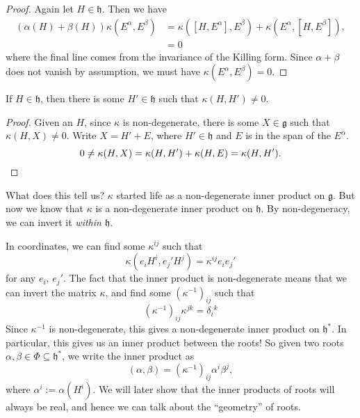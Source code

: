 \documentclass[a4paper]{article}
\begin{document}
\begin{proof}
  Again let $H \in \mathfrak{h}$. Then we have
  \begin{align*}
    (\alpha(H) + \beta(H)) \kappa(E^\alpha, E^\beta) &= \kappa([H, E^\alpha], E^\beta) + \kappa(E^\alpha, [H, E^\beta]),\\
    &= 0
  \end{align*}
  where the final line comes from the invariance of the Killing form. Since $\alpha + \beta$ does not vanish by assumption, we must have $\kappa(E^\alpha, E^\beta) = 0$.
\end{proof}

\begin{lemma}
  If $H \in \mathfrak{h}$, then there is some $H' \in \mathfrak{h}$ such that $\kappa(H, H') \not= 0$.
\end{lemma}

\begin{proof}
  Given an $H$, since $\kappa$ is non-degenerate, there is some $X \in \mathfrak{g}$ such that $\kappa (H, X) \not= 0$. Write $X = H' + E$, where $H' \in \mathfrak{h}$ and $E$ is in the span of the $E^\alpha$.
  \[
    0\not= \kappa(H, X) = \kappa(H, H') + \kappa(H, E) = \kappa(H, H'). \qedhere
  \]
\end{proof}
What does this tell us? $\kappa$ started life as a non-degenerate inner product on $\mathfrak{g}$. But now we know that $\kappa$ is a non-degenerate inner product on $\mathfrak{h}$. By non-degeneracy, we can invert it \emph{within $\mathfrak{h}$}.

In coordinates, we can find some $\kappa^{ij}$ such that
\[
  \kappa(e_i H^i, e_j' H^j) = \kappa^{ij} e_i e_j'
\]
for any $e_i$, $e_j'$. The fact that the inner product is non-degenerate means that we can invert the matrix $\kappa$, and find some $(\kappa^{-1})_{ij}$ such that
\[
  (\kappa^{-1})_{ij} \kappa^{jk} = \delta_i\!^k
\]
Since $\kappa^{-1}$ is non-degenerate, this gives a non-degenerate inner product on $\mathfrak{h}^*$. In particular, this gives us an inner product between the roots! So given two roots $\alpha, \beta \in \Phi \subseteq \mathfrak{h}^*$, we write the inner product as
\[
  (\alpha, \beta) = (\kappa^{-1})_{ij} \alpha^i \beta^j,
\]
where $\alpha^i := \alpha(H^i)$. We will later show that the inner products of roots will always be real, and hence we can talk about the ``geometry'' of roots.
\end{document}
